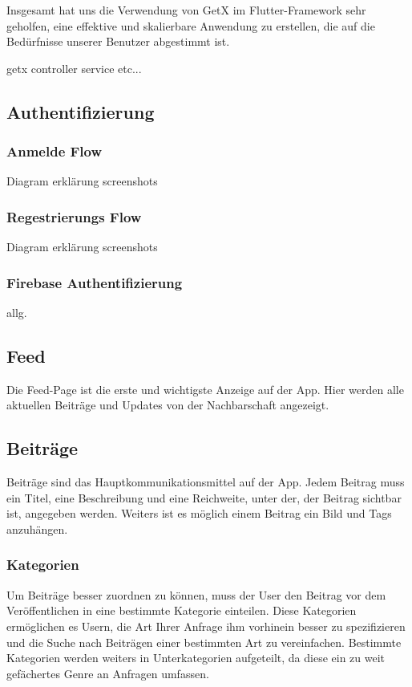 Insgesamt hat uns die Verwendung von GetX im Flutter-Framework sehr geholfen, eine effektive und skalierbare Anwendung zu erstellen, die auf die Bedürfnisse unserer Benutzer abgestimmt ist.
\author{Sandin Habibovic}
getx controller service etc...


\subsection{Authentifizierung}
\author{Sandin Habibovic}

\subsubsection{Anmelde Flow}
\author{Sandin Habibovic}

Diagram
erklärung
screenshots
\subsubsection{Regestrierungs Flow}
\author{Sandin Habibovic}


Diagram
erklärung
screenshots


\subsubsection{Firebase Authentifizierung}
\author{Sandin Habibovic}

allg.


\subsection{Feed}
\author{Sandin Habibovic}
Die Feed-Page ist die erste und wichtigste Anzeige auf der App. Hier werden alle aktuellen Beiträge und Updates von der Nachbarschaft angezeigt.

\subsection{Beiträge}
\author{Sandin Habibovic}
Beiträge sind das Hauptkommunikationsmittel auf der App. Jedem Beitrag muss ein Titel, eine Beschreibung und eine Reichweite, unter der, der Beitrag sichtbar ist, angegeben werden. Weiters ist es möglich einem Beitrag ein Bild und Tags anzuhängen.

\subsubsection{Kategorien}
\author{Sandin Habibovic}
Um Beiträge besser zuordnen zu können, muss der User den Beitrag vor dem Veröffentlichen in eine bestimmte Kategorie einteilen. Diese Kategorien ermöglichen es Usern, die Art Ihrer Anfrage ihm vorhinein besser zu spezifizieren und die Suche nach Beiträgen einer bestimmten Art zu vereinfachen. Bestimmte Kategorien werden weiters in Unterkategorien aufgeteilt, da diese ein zu weit gefächertes Genre an Anfragen umfassen.

